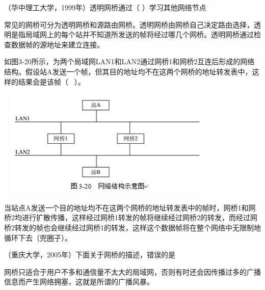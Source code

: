 \question （华中理工大学，1999年）透明网桥通过（ ）学习其他网络节点
\par{}
\begin{solution}常见的网桥可分为透明网桥和源路由网桥。透明网桥由网桥自己决定路由选择，透明是指局域网上的每个站并不知道所发送的帧将经过哪几个网桥。透明网桥通过检查数据帧的源地址来建立连接。
\end{solution}
\question 如图3-20所示，为两个局域网LAN1和LAN2通过网桥1和网桥2互连后形成的网络结构。假设站A发送一个帧，但其目的地址均不在这两个网桥的地址转发表中，这样的结果会是该帧（
~）。

~
\includegraphics[width=3.88542in,height=2.03125in]{computerassets/f0166ec6a5b0627b475a77901a9b2521.jpeg}
\par{}
\begin{solution}当站点A发送一个目的地址均不在这两个网桥的地址转发表中的帧时，网桥1和网桥2均进行扩散传播，这样经过网桥1转发的帧将继续经过网桥2的转发，而经过网桥2转发的帧也会继续经过网桥1的转发，这样这个数据帧将在整个网络中无限制地循环下去（兜圈子）。
\end{solution}
\question （重庆大学，2005年）下面关于网桥的描述，错误的是
\par{}
\begin{solution}网桥只适合于用户不多和通信量不太大的局域网，否则有时还会因传播过多的广播信息而产生网络拥塞，这就是所谓的广播风暴。
\end{solution}
